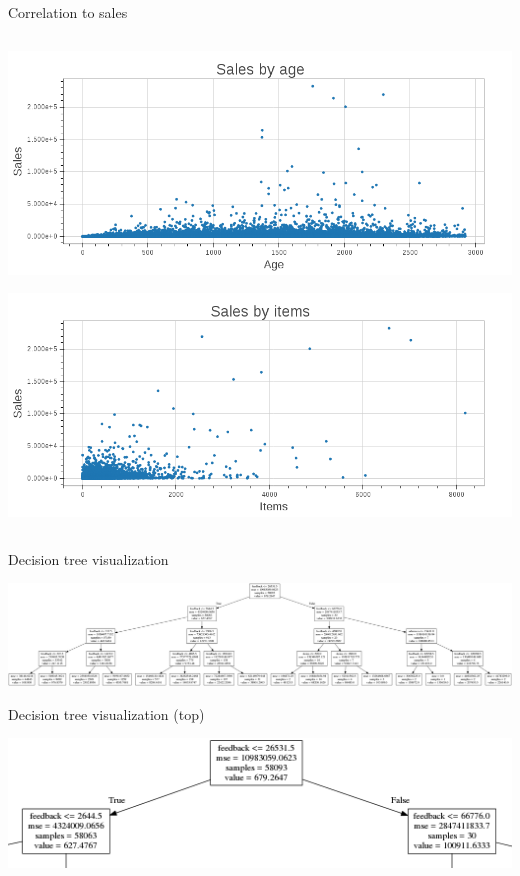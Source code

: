 \begin{frame}[fragile]{Correlation to sales}
\begin{columns}
     \begin{column}{.49\textwidth}
        \begin{center}
            \includegraphics[scale=.18]{images/scatter_age}
        \end{center}
        \newline{}
        \begin{center}
            \includegraphics[scale=.18]{images/scatter_items}
        \end{center}
     \end{column}
    \end{columns}

\end{frame}

\begin{frame}[fragile]{Decision tree visualization}
    \begin{center}
        \includegraphics[scale=.13]{images/etsy_tree}
    \end{center}
\end{frame}

\begin{frame}[fragile]{Decision tree visualization (top)}
    \begin{center}
        \includegraphics[scale=.40]{images/etsy_tree_top}
    \end{center}
\end{frame}

